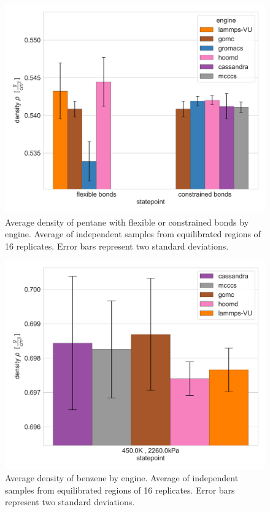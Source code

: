 \begin{figure}[h!]
    \centering
    \includegraphics[width=0.8\linewidth,keepaspectratio]{figures/rep_study/pentane_summary.png}
    \caption{Average density of pentane with flexible or constrained bonds by engine. Average of independent samples from equilibrated regions of 16 replicates. Error bars represent two standard deviations.}\label{fig:pentane_constrain_density}
\end{figure}

\begin{figure}[h!]
    \centering
    \includegraphics[width=0.8\linewidth,keepaspectratio]{figures/rep_study/benzeneUA_summary.png}
    \caption{Average density of benzene by engine. Average of independent samples from equilibrated regions of 16 replicates. Error bars represent two standard deviations.}\label{fig:benzene_density}
\end{figure}

